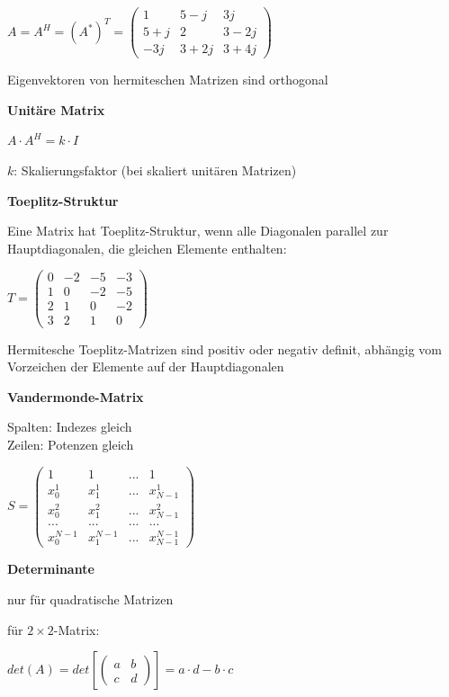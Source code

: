 $\displaystyle{
    A = A^H = (A^*)^T =
    \begin{pmatrix}
        1 & 5 - j & 3j\\
        5 + j & 2 & 3 - 2j\\
        -3j & 3 + 2j & 3 +4j
    \end{pmatrix}
}$

Eigenvektoren von hermiteschen Matrizen sind orthogonal

\textbf{Unitäre Matrix}

$\displaystyle{
    A \cdot A^H = k \cdot I
}$

$k$: Skalierungsfaktor (bei skaliert unitären Matrizen)

\textbf{Toeplitz-Struktur}

Eine Matrix hat Toeplitz-Struktur, wenn alle Diagonalen parallel zur Hauptdiagonalen, die gleichen Elemente enthalten:

$\displaystyle{
    T =
    \begin{pmatrix}
        0 & -2 & -5 & -3\\
        1 & 0 & -2 & -5 \\
        2 & 1 & 0 & -2  \\
        3 & 2 & 1 & 0
    \end{pmatrix}
}$
 
Hermitesche Toeplitz-Matrizen sind positiv oder negativ definit, abhängig vom Vorzeichen der
Elemente auf der Hauptdiagonalen

\textbf{Vandermonde-Matrix}

Spalten: Indezes gleich\\
Zeilen: Potenzen gleich

$\displaystyle{
    S =
    \begin{pmatrix}
        1 & 1 & ... & 1\\
        x_0^1 & x_1^1 & ... & x_{N-1}^1\\
        x_0^2 & x_1^2 & ... & x_{N-1}^2\\
        ... & ... & ... & ...\\
        x_0^{N-1} & x_1^{N-1} & ... & x_{N-1}^{N-1}
    \end{pmatrix}
}$

\textbf{Determinante}

nur für quadratische Matrizen

für $2 \times 2$-Matrix:

$\displaystyle{
    det(A) = det\left[
        \begin{pmatrix}
            a & b\\
            c & d
        \end{pmatrix}
    \right] = 
    a \cdot d - b\cdot c
}$

